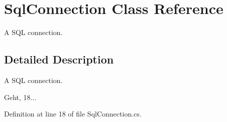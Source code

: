 \section{Sql\-Connection Class Reference}
\label{class_sql_connection}


A S\-Q\-L connection.  




\subsection{Detailed Description}
A S\-Q\-L connection. 

Geht, 18... 

Definition at line 18 of file Sql\-Connection.\-cs.

